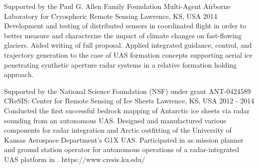 \begin{cventries}
\begin{multicols}{2}
  \cvprojentry
    {Supported by the Paul G. Allen Family Foundation} %
    {Multi-Agent Airborne Laboratory for Cryospheric Remote Sensing} %
    {Lawrence, KS, USA} %
    {2014} %
    {Development and testing of distributed sensors in coordinated flight in order to better measure and characterize the impact of climate changes on fast-flowing glaciers.} %
    {Aided writing of full proposal. Applied integrated guidance, control, and trajectory generation to the case of UAS formation concepts supporting aerial ice penetrating synthetic aperture radar systems in a relative formation holding approach.} %
    {}
    
  \cvprojentry
    {Supported by the National Science Foundation (NSF) under grant ANT-0424589} %
    {CReSIS: Center for Remote Sensing of Ice Sheets} %
    {Lawrence, KS, USA} %
    {2012 - 2014} %
    {Conducted the first successful bedrock mapping of Antarctic ice sheets via radar sounding from an autonomous UAS.} %
    {Designed and manufactured various components for radar integration and Arctic outfitting of the University of Kansas Aerospace Department's G1X UAS. Participated in  as mission planner and ground station operator for autonomous operations of a radar-integrated UAS platform in .} %
    {https://www.cresis.ku.edu/}

\end{multicols}
\end{cventries}
